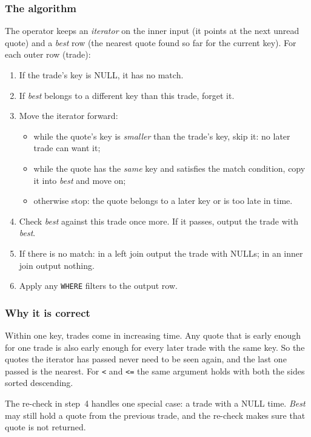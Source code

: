 \documentclass[11pt,a4paper]{article}
\newcommand{\code}[1]{\texttt{#1}}
\begin{document}
\subsubsection{The algorithm}

The operator keeps an \emph{iterator} on the inner input (it points at the next unread
quote) and a \emph{best} row (the nearest quote found so far for the current key). For
each outer row (trade):

\begin{enumerate}
  \item If the trade's key is NULL, it has no match.
  \item If \emph{best} belongs to a different key than this trade, forget it.
  \item Move the iterator forward:
    \begin{itemize}
      \item while the quote's key is \emph{smaller} than the trade's key, skip it: no
            later trade can want it;
      \item while the quote has the \emph{same} key and satisfies the match condition,
            copy it into \emph{best} and move on;
      \item otherwise stop: the quote belongs to a later key or is too late in time.
    \end{itemize}
  \item Check \emph{best} against this trade once more. If it passes, output the trade
        with \emph{best}.
  \item If there is no match: in a left join output the trade with NULLs; in an inner
        join output nothing.
  \item Apply any \code{WHERE} filters to the output row.
\end{enumerate}

\subsubsection{Why it is correct}

Within one key, trades come in increasing time. Any quote that is early enough for one
trade is also early enough for every later trade with the same key. So the quotes the
iterator has passed never need to be seen again, and the last one passed is the nearest.
For \code{<} and \code{<=} the same argument holds with both the sides sorted descending.

The re-check in step~4 handles one special case: a trade with a NULL time. \emph{Best}
may still hold a quote from the previous trade, and the re-check makes sure that quote is
not returned.
\end{document}
